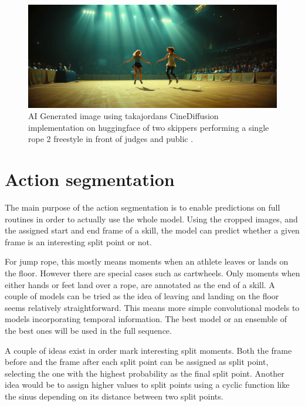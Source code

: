 \begin{figure}
    \centering
    \includegraphics[width=0.95\linewidth]{img/sr2-performance-ai-generated-HF-cinedifusion.png}
    \caption[AI Generated image using takajordans CineDiffusion implementation on huggingface of two skippers performing a single rope 2 freestyle in front of judges and public]{AI Generated image using takajordans CineDiffusion implementation on huggingface of two skippers performing a single rope 2 freestyle in front of judges and public \autocite{HF_takarajordan_CineDiffusion}.}
    \label{fig:sr2-performance-ai-generated}
\end{figure}


\section{Action segmentation}

The main purpose of the action segmentation is to enable predictions on full routines in order to actually use the whole model. Using the cropped images, and the assigned start and end frame of a skill, the model can predict whether a given frame is an interesting split point or not.

For jump rope, this mostly means moments when an athlete leaves or lands on the floor. However there are special cases such as cartwheels. Only moments when either hands or feet land over a rope, are annotated as the end of a skill. A couple of models can be tried as the idea of leaving and landing on the floor seems relatively straightforward. This means more simple convolutional models to models incorporating temporal information.
The best model or an ensemble of the best ones will be used in the full sequence.

A couple of ideas exist in order mark interesting split moments. Both the frame before and the frame after each split point can be assigned as split point, selecting the one with the highest probability as the final split point. Another idea would be to assign higher values to split points using a cyclic function like the sinus depending on its distance between two split points.

